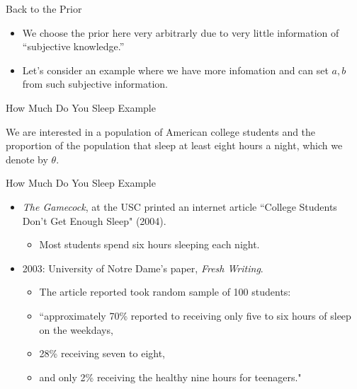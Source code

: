 \documentclass[
  ignorenonframetext,
]{beamer}
\begin{document}
\begin{frame}{Back to the Prior}
\protect\hypertarget{back-to-the-prior}{}

\begin{itemize}
\item
  We choose the prior here very arbitrarly due to very little
  information of ``subjective knowledge.''
\item
  Let's consider an example where we have more infomation and can set
  \(a,b\) from such subjective information.
\end{itemize}

\end{frame}

\begin{frame}{How Much Do You Sleep Example}
\protect\hypertarget{how-much-do-you-sleep-example}{}

We are interested in a population of American college students and the
proportion of the population that sleep at least eight hours a night,
which we denote by \(\theta.\)

\end{frame}

\begin{frame}{How Much Do You Sleep Example}
\protect\hypertarget{how-much-do-you-sleep-example-1}{}

\begin{itemize}

\item  \emph{The Gamecock}, at the USC printed an internet article ``College Students Don't Get Enough Sleep" (2004).  \begin{itemize}
\item Most students spend six hours sleeping each night. 
\end{itemize}
\item 2003: University of Notre Dame's paper, \emph{Fresh Writing}. 
\begin{itemize}
\item The article  reported took random sample of 100 students:
\item ``approximately 70\% reported to receiving only five to six hours of sleep on the weekdays, 
\item 28\% receiving seven to eight, 
\item and only 2\% receiving the healthy nine hours for teenagers."
\end{itemize}
\end{itemize}

\end{frame}
\end{document}
